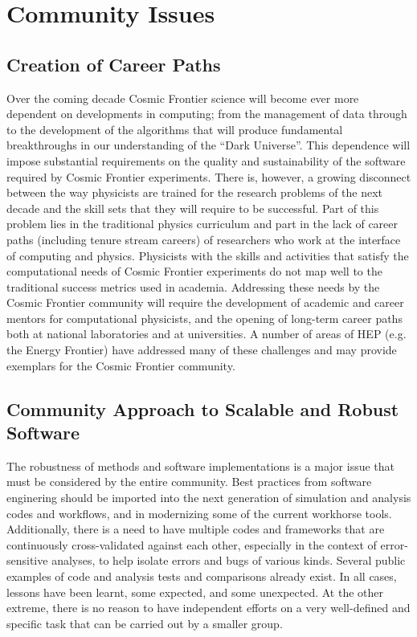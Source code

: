 \section{Community Issues}

\subsection{Creation of Career Paths}

Over the coming decade Cosmic Frontier science will become ever more
dependent on developments in computing; from the management of data
through to the development of the algorithms that will produce
fundamental breakthroughs in our understanding of the ``Dark
Universe''. This dependence will impose substantial requirements on
the quality and sustainability of the software required by Cosmic
Frontier experiments. There is, however, a growing disconnect between
the way physicists are trained for the research problems of the next
decade and the skill sets that they will require to be
successful. Part of this problem lies in the traditional physics
curriculum and part in the lack of career paths (including tenure
stream careers) of researchers who work at the interface of computing
and physics. Physicists with the skills and activities that satisfy
the computational needs of Cosmic Frontier experiments do not map well
to the traditional success metrics used in academia. Addressing these
needs by the Cosmic Frontier community will require the development of
academic and career mentors for computational physicists, and the
opening of long-term career paths both at national laboratories and at
universities. A number of areas of HEP (e.g. the Energy Frontier) have
addressed many of these challenges and may provide exemplars for the
Cosmic Frontier community.

\subsection{Community Approach to Scalable and Robust
    Software}

The robustness of methods and software implementations is a major
issue that must be considered by the entire community. Best practices
from software enginering should be imported into the next generation
of simulation and analysis codes and workflows, and in modernizing
some of the current workhorse tools. Additionally, there is
a need to have multiple codes and frameworks that are continuously
cross-validated against each other, especially in the context of
error-sensitive analyses, to help isolate errors and bugs of various
kinds. Several public examples of code and analysis tests and
comparisons already exist. In all cases, lessons have been learnt,
some expected, and some unexpected. At the other extreme, there is no
reason to have independent efforts on a very well-defined and specific
task that can be carried out by a smaller group.

